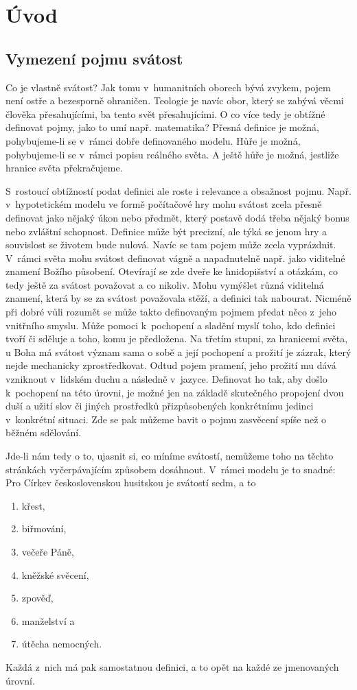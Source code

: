 \chapter{Úvod}
\label{kap:uvod}

\section{Vymezení pojmu svátost}
\label{div:vymezeni}

Co je vlastně svátost? Jak tomu v~humanitních oborech bývá zvykem, pojem není
ostře a bezesporně ohraničen. Teologie je navíc obor, který se zabývá věcmi
člověka přesahujícími, ba tento svět přesahujícími. O co více tedy je obtížné
definovat pojmy, jako to umí např. matematika? Přesná definice je možná,
pohybujeme-li se v~rámci dobře definovaného modelu. Hůře je možná, pohybujeme-li
se v~rámci popisu reálného světa. A ještě hůře je možná, jestliže hranice světa
překračujeme.

S~rostoucí obtížností podat definici ale roste i relevance a obsažnost pojmu.
Např. v~hypotetickém modelu ve formě počítačové hry mohu svátost zcela přesně
definovat jako nějaký úkon nebo předmět, který postavě dodá třeba nějaký bonus
nebo zvláštní schopnost. Definice může být precizní, ale týká se jenom hry a
souvislost se životem bude nulová. Navíc se tam pojem může zcela vyprázdnit.
V~rámci světa mohu svátost definovat vágně a napadnutelně např. jako viditelné
znamení Božího působení. Otevírají se zde dveře ke hnidopišství a otázkám, co
tedy ještě za svátost považovat a co nikoliv. Mohu vymýšlet různá viditelná
znamení, která by se za svátost považovala stěží, a definici tak nabourat.
Nicméně při dobré vůli rozumět se může takto definovaným pojmem předat něco
z~jeho vnitřního smyslu. Může pomoci k~pochopení a sladění myslí toho, kdo
definici tvoří či sděluje a toho, komu je předložena. Na třetím stupni, za
hranicemi světa, u Boha má svátost význam sama o sobě a její pochopení a prožití
je zázrak, který nejde mechanicky zprostředkovat. Odtud pojem pramení, jeho
prožití mu dává vzniknout v~lidském duchu a následně v~jazyce. Definovat ho tak,
aby došlo k~pochopení na této úrovni, je možné jen na základě skutečného
propojení dvou duší a užití slov či jiných prostředků přizpůsobených konkrétnímu
jedinci v~konkrétní situaci. Zde se pak můžeme bavit o pojmu zasvěcení spíše než
o běžném sdělování.

Jde-li nám tedy o to, ujasnit si, co míníme svátostí, nemůžeme toho na těchto
stránkách vyčerpávajícím způsobem dosáhnout. V~rámci modelu je to snadné: Pro
Církev československou husitskou je svátostí sedm, a to
\begin{enumerate}
\item{křest,}
\item{biřmování,}
\item{večeře Páně,}
\item{kněžské svěcení,}
\item{zpověď,}
\item{manželství a}
\item{útěcha nemocných.}
\end{enumerate}
Každá z~nich má pak samostatnou definici, a to opět na každé ze jmenovaných
úrovní.

